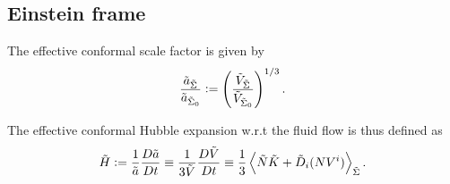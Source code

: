 



\subsection{Einstein frame}

The effective conformal scale factor is given by
\begin{equation}
    \frac{\Tilde{a}_{\Tilde{\Sigma}}}{\Tilde{a}_{\Tilde{\Sigma}_0}}:=\left(\frac{\Tilde{V}_{\Tilde{\Sigma}}}{\Tilde{V}_{\Tilde{\Sigma}_0}}\right)^{1/3}.
\end{equation}

The effective conformal Hubble expansion w.r.t the fluid flow is thus defined as
\begin{equation}
    \Tilde{H} := \frac{1}{\Tilde{a}}\frac{D\Tilde{a}}{Dt}\equiv \frac{1}{3\Tilde{V}}\frac{D\Tilde{V}}{Dt}\equiv\frac{1}{3}\left\langle \Tilde{N}\Tilde{K}+\tilde{D}_i(NV^i) \right\rangle_{\Tilde{\Sigma}}.
\end{equation}

